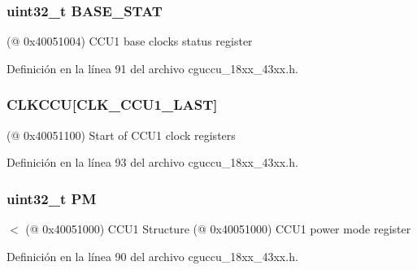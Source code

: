 \subsubsection[{\texorpdfstring{B\+A\+S\+E\+\_\+\+S\+T\+AT}{BASE_STAT}}]{ uint32\+\_\+t B\+A\+S\+E\+\_\+\+S\+T\+AT}\hypertarget{struct_l_p_c___c_c_u1___t_aa450381b00ff7d07b6cb5fbcf761dfdc}{}\label{struct_l_p_c___c_c_u1___t_aa450381b00ff7d07b6cb5fbcf761dfdc}
(@ 0x40051004) C\+C\+U1 base clocks status register 

Definición en la línea 91 del archivo cguccu\+\_\+18xx\+\_\+43xx.\+h.

\subsubsection[{\texorpdfstring{C\+L\+K\+C\+CU}{CLKCCU}}]{ C\+L\+K\+C\+CU\mbox{[}{\bf C\+L\+K\+\_\+\+C\+C\+U1\+\_\+\+L\+A\+ST}\mbox{]}}\hypertarget{struct_l_p_c___c_c_u1___t_a9d5831b9a6d0d17d948eafe66b290dc1}{}\label{struct_l_p_c___c_c_u1___t_a9d5831b9a6d0d17d948eafe66b290dc1}
(@ 0x40051100) Start of C\+C\+U1 clock registers 

Definición en la línea 93 del archivo cguccu\+\_\+18xx\+\_\+43xx.\+h.

\subsubsection[{\texorpdfstring{PM}{PM}}]{ uint32\+\_\+t PM}\hypertarget{struct_l_p_c___c_c_u1___t_a3d44c3611cd3eaefe7d7214409ef00b8}{}\label{struct_l_p_c___c_c_u1___t_a3d44c3611cd3eaefe7d7214409ef00b8}
$<$ (@ 0x40051000) C\+C\+U1 Structure (@ 0x40051000) C\+C\+U1 power mode register 

Definición en la línea 90 del archivo cguccu\+\_\+18xx\+\_\+43xx.\+h.

